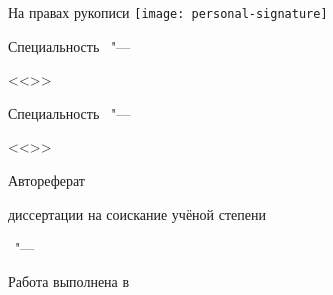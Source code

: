 \thispagestyle{empty}

\vspace{0pt plus1fill} %
\begin{flushright}
  \large{На правах рукописи}
  \texttt{[image: personal-signature]} 
\end{flushright}

\vspace{0pt plus3fill} %
\begin{center}
\textbf {\large \thesisAuthor}
\end{center}

\vspace{0pt plus3fill} %
\begin{center}
\textbf {\Large \thesisTitle}

\vspace{0pt plus3fill} %
{\large Специальность \thesisSpecialtyNumber\ "---\par <<\thesisSpecialtyTitle>>}\par
{\large Специальность \thesisSpecialtyNumberSecond\ "---\par <<\thesisSpecialtyTitleSecond>>}\par

\vspace{0pt plus1.5fill} %
\Large{Автореферат}\par
\large{диссертации на соискание учёной степени\par \thesisDegree}
\end{center}

\vspace{0pt plus4fill} %
\begin{center}
{\large{\thesisCity\ "--- \thesisYear}}
\end{center}

\newpage
\thispagestyle{empty}
\noindent Работа выполнена в \thesisInOrganization

